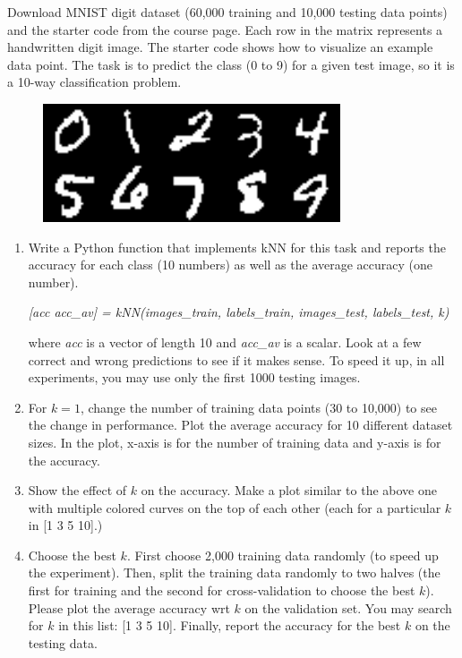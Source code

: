 \documentclass[fleqn]{article}
\begin{document}
Download MNIST digit dataset (60,000 training and 10,000 testing data points) and the starter code from the course page. Each row in the matrix represents a handwritten digit image. The starter code shows how to visualize an example data point. The task is to predict the class (0 to 9) for a given test image, so it is a 10-way classification problem.

\begin{figure}[h]
	\centering
	\includegraphics[width=.4\linewidth]{mnist-dataset.png}
\end{figure}


\begin{enumerate}


	\item Write a Python function that implements kNN for this task and reports the accuracy for each class (10 numbers) as well as the average accuracy (one number).

		      {\em [acc acc\_av] = kNN(images\_train, labels\_train, images\_test, labels\_test, k)}

	      where {\em acc} is a vector of length 10 and {\em acc\_av} is a scalar. Look at a few correct and wrong predictions to see if it makes sense. To speed it up, in all experiments, you may use only the first 1000 testing images.

	\item For $k=1$, change the number of training data points (30 to 10,000) to see the change in performance. Plot the average accuracy for 10 different dataset sizes. In the plot, x-axis is for the number of training data and y-axis is for the accuracy.

	\item Show the effect of $k$ on the accuracy. Make a plot similar to the above one with multiple colored curves on the top of each other (each for a particular $k$ in [1 3 5 10].)

	\item Choose the best $k$. First choose 2,000 training data randomly (to speed up the experiment). Then, split the training data randomly to two halves (the first for training and the second for cross-validation to choose the best $k$). Please plot the average accuracy wrt $k$ on the validation set. You may search for $k$ in this list: [1 3 5 10]. Finally, report the accuracy for the best $k$ on the testing data.

\end{enumerate}
\end{document}
